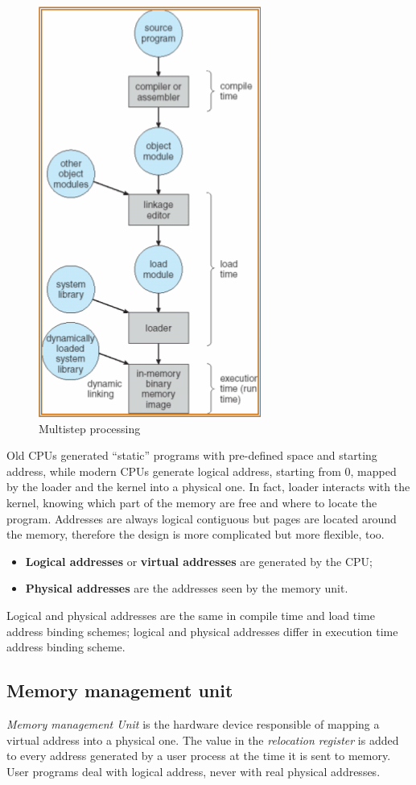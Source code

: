 \begin{figure}[hbtp]
\centering
\includegraphics[scale=0.4]{images/memory_management/multistep_processing.jpg}
\caption{Multistep processing}
\end{figure}

Old CPUs generated ``static'' programs with pre-defined space and starting address, while modern CPUs generate logical address, starting from 0, mapped by the loader and the kernel into a physical one. In fact, loader interacts with the kernel, knowing which part of the memory are free and where to locate the program.
Addresses are always logical contiguous but pages are located around the memory, therefore the design is more complicated but more flexible, too.

\begin{itemize}
\item \textbf{Logical addresses} or \textbf{virtual addresses} are generated by the CPU;
\item \textbf{Physical addresses} are the addresses seen by the memory unit.
\end{itemize}
Logical and physical addresses are the same in compile time and load time address binding schemes; logical and physical addresses differ in execution time address binding scheme.

\subsection*{Memory management unit}
\emph{Memory management Unit} is the hardware device responsible of mapping a virtual address into a physical one. The value in the \emph{relocation register} is added to every address generated by a user process at the time it is sent to memory. User programs deal with logical address, never with real physical addresses.

